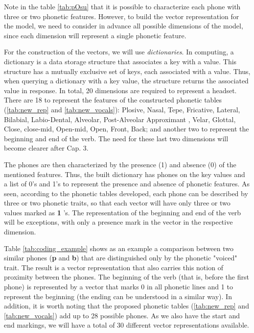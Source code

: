 Note in the table \ref{tab:pOsu} that it is possible to characterize each phone with three or two phonetic features. However, to build the vector representation for the model, we need to consider in advance all possible dimensions of the model, since each dimension will represent a single phonetic feature.

For the construction of the vectors, we will use \textit{dictionaries}. In computing, a dictionary is a data storage structure that associates a key with a value. This structure has a mutually exclusive set of keys, each associated with a value. Thus, when querying a dictionary with a key value, the structure returns the associated value in response. In total, 20 dimensions are required to represent a headset. There are 18 to represent the features of the constructed phonetic tables (\ref{tab:new_rep} and \ref{tab:new_vocals}): Plosive, Nasal, Tepe, Fricative, Lateral, Bilabial, Labio-Dental, Alveolar, Post-Alveolar Approximant , Velar, Glottal, Close, close-mid, Open-mid, Open, Front, Back; and another two to represent the beginning and end of the verb. The need for these last two dimensions will become clearer after Cap. 3.

The phones are then characterized by the presence (1) and absence (0) of the mentioned features. Thus, the built dictionary has phones on the key values and a list of 0's and 1's to represent the presence and absence of phonetic features. As seen, according to the phonetic tables developed, each phone can be described by three or two phonetic traits, so that each vector will have only three or two values marked as \textbf{1} 's. The representation of the beginning and end of the verb will be exceptions, with only a presence mark in the vector in the respective dimension.

Table \ref{tab:coding_example} shows as an example a comparison between two similar phones (\textbf{p} and \textbf{b}) that are distinguished only by the phonetic "voiced" trait. The result is a vector representation that also carries this notion of proximity between the phones. The beginning of the verb (that is, before the first phone) is represented by a vector that marks 0 in all phonetic lines and 1 to represent the beginning (the ending can be understood in a similar way). In addition, it is worth noting that the proposed phonetic tables (\ref{tab:new_rep} and \ref{tab:new_vocals}) add up to 28 possible phones. As we also have the start and end markings, we will have a total of 30 different vector representations available.

